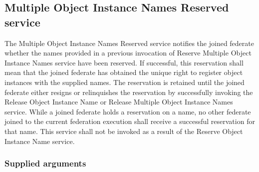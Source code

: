 \begin{compactstdpage}

    \subsection{Multiple Object Instance Names Reserved \rtiinitiated{} service}


    The Multiple Object Instance Names Reserved \rtiinitiated{} service notifies the joined federate whether the names provided in a previous invocation of Reserve Multiple Object Instance Names service have been reserved. If successful, this reservation shall mean that the joined federate has obtained the unique right to register object instances with the supplied names. The reservation is retained until the joined federate either resigns or relinquishes the reservation by successfully invoking the Release Object Instance Name or Release Multiple Object Instance Names service. While a joined federate holds a reservation on a name, no other federate joined to the current federation execution shall receive a successful reservation for that name. This service shall not be invoked as a result of the Reserve Object Instance Name service.

    \subsubsection{Supplied arguments}



\end{compactstdpage}

\clearpage

